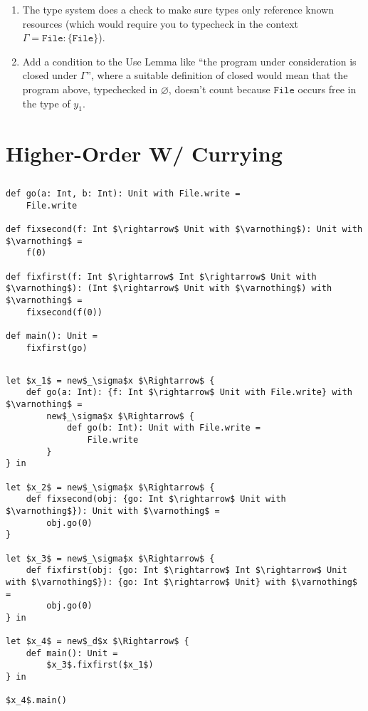 \documentclass{llncs}
\newcommand{\keywadj}[1]{\mathtt{#1}}
\newcommand{\kwa}[1]{\keywadj{ #1 }}
\begin{document}
\begin{enumerate}
	\item The type system does a check to make sure types only reference known resources (which would require you to typecheck in the context $\Gamma = \kwa{File} : \{ \kwa{File} \}$).
	\item Add a condition to the Use Lemma like ``the program under consideration is closed under $\Gamma$'', where a suitable definition of closed would mean that the program above, typechecked in $\varnothing$, doesn't count because $\kwa{File}$ occurs free in the type of $y_1$.
\end{enumerate}


\section{Higher-Order W/ Currying}

\subsection{}

\begin{lstlisting}
def go(a: Int, b: Int): Unit with File.write =
    File.write
    
def fixsecond(f: Int $\rightarrow$ Unit with $\varnothing$): Unit with $\varnothing$ =
    f(0)

def fixfirst(f: Int $\rightarrow$ Int $\rightarrow$ Unit with $\varnothing$): (Int $\rightarrow$ Unit with $\varnothing$) with $\varnothing$ =
    fixsecond(f(0))
    
def main(): Unit =
    fixfirst(go)
\end{lstlisting}

\subsection{}

\begin{lstlisting}
let $x_1$ = new$_\sigma$x $\Rightarrow$ {
    def go(a: Int): {f: Int $\rightarrow$ Unit with File.write} with $\varnothing$ =
        new$_\sigma$x $\Rightarrow$ {
            def go(b: Int): Unit with File.write =
                File.write
        }
} in

let $x_2$ = new$_\sigma$x $\Rightarrow$ {
    def fixsecond(obj: {go: Int $\rightarrow$ Unit with $\varnothing$}): Unit with $\varnothing$ =
        obj.go(0)
}

let $x_3$ = new$_\sigma$x $\Rightarrow$ {
    def fixfirst(obj: {go: Int $\rightarrow$ Int $\rightarrow$ Unit with $\varnothing$}): {go: Int $\rightarrow$ Unit} with $\varnothing$ =
        obj.go(0)
} in

let $x_4$ = new$_d$x $\Rightarrow$ {
    def main(): Unit =
        $x_3$.fixfirst($x_1$)
} in

$x_4$.main()
\end{lstlisting}
\end{document}

